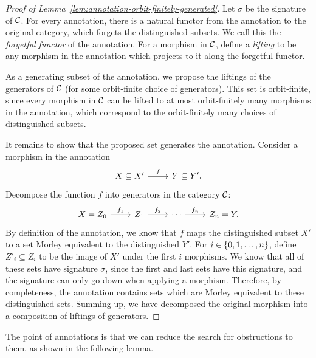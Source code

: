 \begin{proof}[Proof of Lemma~\ref{lem:annotation-orbit-finitely-generated}]

    Let $\sigma$ be the signature of ${\mathcal C}$. 
    For every annotation, there is a natural functor from the annotation to the original category, which forgets the  distinguished subsets. We call this the \emph{forgetful functor} of the annotation. For a morphism in ${\mathcal C}$, define a \emph{lifting} to be any morphism in the annotation which projects to it along the forgetful functor. 



As a generating subset of the annotation, we propose the liftings of the generators of ${\mathcal C}$  (for some orbit-finite choice of generators). This set is orbit-finite, since every morphism in ${\mathcal C}$ can be lifted to at most orbit-finitely many morphisms in the annotation,  which correspond to the orbit-finitely many choices of distinguished subsets. 

It remains to show that the proposed set generates the annotation. 
Consider a morphism in the annotation 
\[
\begin{tikzcd}
X \subseteq X'
\ar[r,"f"] & 
Y \subseteq Y'.
\end{tikzcd}
\]
Decompose the function $f$ into generators in the category ${\mathcal C}$:
    \[
\begin{tikzcd}
X = Z_0 \ar[r,"f_1"] & 
Z_1 \ar[r,"f_2"] &
\cdots 
\ar[r,"f_n"]
&  Z_n = Y.
\end{tikzcd}
\]
By definition of the annotation, we know that $f$ maps the distinguished subset $X'$ to a set Morley equivalent to the distinguished  $Y'$. For $i \in \{0,1,\ldots,n\}$, define $Z'_i \subseteq Z_i$ to be the image of $X'$ under the first $i$ morphisms. We know that all of these sets have signature $\sigma$, since the first and last sets have this signature, and the signature can only go down when applying a morphism. Therefore, by completeness, the annotation contains sets which are Morley equivalent to these distinguished sets. Summing up, we have decomposed the original morphism into a composition of liftings of generators. 
\end{proof}


The point of annotations is that we can reduce the search for obstructions to them, as shown in the following lemma. 

